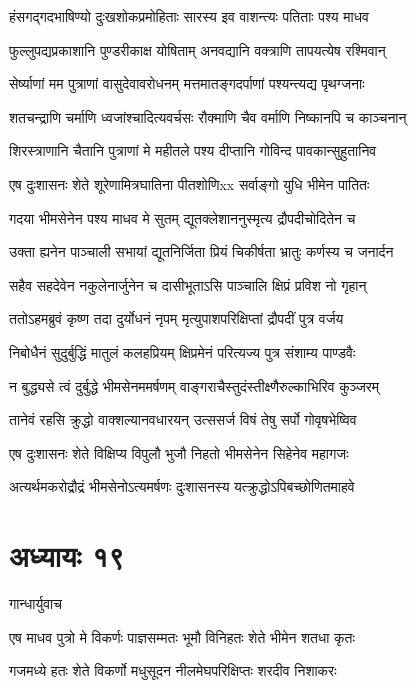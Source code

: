 \twolineshloka
{हंसगद्गदभाषिण्यो दुःखशोकप्रमोहिताः}
{सारस्य इव वाशन्त्यः पतिताः पश्य माधव}


\twolineshloka
{फुल्लुपद्यप्रकाशानि पुण्डरीकाक्ष योषिताम्}
{अनवद्यानि वक्त्राणि तापयत्येष रश्मिवान्}


\twolineshloka
{सेर्ष्याणां मम पुत्राणां वासुदेवावरोधनम्}
{मत्तमातङ्गदर्पाणां पश्यन्त्यद्य पृथग्जनाः}


\twolineshloka
{शतचन्द्राणि चर्माणि ध्वजांश्चादित्यवर्चसः}
{रौक्माणि चैव वर्माणि निष्कानपि च काञ्चनान्}


\twolineshloka
{शिरस्त्राणानि चैतानि पुत्राणां मे महीतले}
{पश्य दीप्तानि गोविन्द पावकान्सुहुतानिव}


\twolineshloka
{एष दुःशासनः शेते शूरेणामित्रघातिना}
{पीतशोणिxx सर्वाङ्गो युधि भीमेन पातितः}


\twolineshloka
{गदया भीमसेनेन पश्य माधव मे सुतम्}
{द्यूतक्लेशाननुस्मृत्य द्रौपदीचोदितेन च}


\twolineshloka
{उक्ता ह्यनेन पाञ्चाली सभायां द्यूतनिर्जिता}
{प्रियं चिकीर्षता भ्रातुः कर्णस्य च जनार्दन}


\twolineshloka
{सहैव सहदेवेन नकुलेनार्जुनेन च}
{दासीभूताऽसि पाञ्चालि क्षिप्रं प्रविश नो गृहान्}


\twolineshloka
{ततोऽहमब्रुवं कृष्ण तदा दुर्योधनं नृपम्}
{मृत्युपाशपरिक्षिप्तां द्रौपदीं पुत्र वर्जय}


\twolineshloka
{निबोधैनं सुदुर्बुद्धिं मातुलं कलहप्रियम्}
{क्षिप्रमेनं परित्यज्य पुत्र संशाम्य पाण्डवैः}


\twolineshloka
{न बुद्ध्यसे त्वं दुर्बुद्धे भीमसेनममर्षणम्}
{वाङ्गराचैस्तुदंस्तीक्ष्णैरुल्काभिरिव कुञ्जरम्}


\twolineshloka
{तानेवं रहसि क्रुद्धो वाक्शल्यानवधारयन्}
{उत्ससर्ज विषं तेषु सर्पो गोवृषभेष्विव}


\twolineshloka
{एष दुःशासनः शेते विक्षिप्य विपुलौ भुजौ}
{निहतो भीमसेनेन सिहेनेव महागजः}


\twolineshloka
{अत्यर्थमकरोद्रौद्रं भीमसेनोऽत्यमर्षणः}
{दुःशासनस्य यत्क्रुद्धोऽपिबच्छोणितमाहवे}


\chapter{अध्यायः १९}
\twolineshloka
{गान्धार्युवाच}
{}


\twolineshloka
{एष माधव पुत्रो मे विकर्णः पाज्ञसम्मतः}
{भूमौ विनिहतः शेते भीमेन शतधा कृतः}


\twolineshloka
{गजमध्ये हतः शेते विकर्णो मधुसूदन}
{नीलमेघपरिक्षिप्तः शरदीव निशाकरः}


